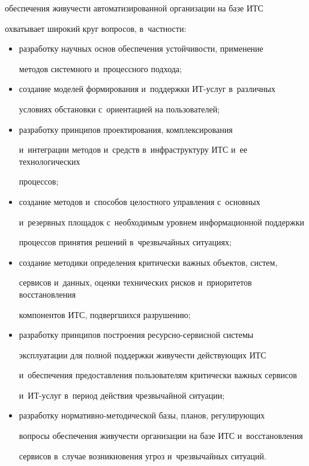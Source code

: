 обеспечения живучести автоматизированной организации на базе ИТС 


охватывает широкий круг вопросов, в~частности:


  \begin{itemize}


  \item разработку научных основ обеспечения устойчивости, применение 


методов сис\-тем\-но\-го и~процессного подхода;


  \item создание моделей формирования и~поддержки ИТ-услуг в~различных 


условиях обстановки с~ориентацией на пользователей;


  \item разработку принципов проектирования, комплексирования 


и~интеграции методов и~средств в~инфраструктуру ИТС и~ее технологических 


процессов;


  \item создание методов и~способов целостного управления с~основных 


и~резервных площадок с~необходимым уровнем информационной поддержки 


процессов принятия решений в~чрезвычайных ситуациях;


  \item создание методики определения критически важных объектов, сис\-тем, 


сервисов и~данных, оценки технических рисков и~приоритетов восстановления 


компонентов ИТС, подвергшихся разрушению;


  \item разработку принципов построения ре\-сурс\-но-сер\-вис\-ной сис\-те\-мы 


эксплуатации для полной поддержки живучести действующих ИТС 


и~обеспечения предоставления пользователям критически важных сервисов 


и~ИТ-услуг в~период действия чрезвычайной ситуации;


  \item разработку нормативно-методической базы, планов, регулирующих 


вопросы обеспечения живучести организации на базе ИТС и~восстановления 


сервисов в~случае возникновения угроз и~чрезвычайных ситуаций.


  \end{itemize}


